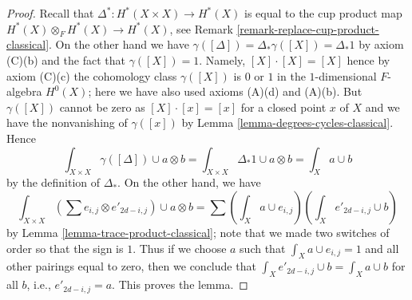 \documentclass[10pt,a4paper]{amsart}
\theoremstyle{plain}
\theoremstyle{definition}
\theoremstyle{remark}
\numberwithin{equation}{subsection}
\begin{document}
\begin{proof}
Recall that $\Delta^* : H^*(X \times X) \to H^*(X)$ is equal to the
cup product map $H^*(X) \otimes_F H^*(X) \to H^*(X)$, see
Remark \ref{remark-replace-cup-product-classical}. On the other hand we have
$\gamma([\Delta]) = \Delta_*\gamma([X]) = \Delta_*1$ by
axiom (C)(b) and the fact that $\gamma([X]) = 1$. Namely,
$[X] \cdot [X] = [X]$ hence by axiom (C)(c) the cohomology class
$\gamma([X])$ is $0$ or $1$ in the $1$-dimensional $F$-algebra $H^0(X)$;
here we have also used axioms (A)(d) and (A)(b).
But $\gamma([X])$ cannot be zero as $[X] \cdot [x] = [x]$
for a closed point $x$ of $X$ and we have the nonvanishing
of $\gamma([x])$ by Lemma \ref{lemma-degrees-cycles-classical}.
Hence
$$
\int_{X \times X} \gamma([\Delta]) \cup a \otimes b =
\int_{X \times X} \Delta_*1 \cup a \otimes b =
\int_X a \cup b
$$
by the definition of $\Delta_*$. On the other hand, we have
$$
\int_{X \times X} (\sum e_{i, j} \otimes e'_{2d -i , j}) \cup a \otimes b =
\sum (\int_X a \cup e_{i, j})(\int_X e'_{2d - i, j} \cup b)
$$
by Lemma \ref{lemma-trace-product-classical}; note that we made
two switches of order so that the sign is $1$.
Thus if we choose $a$ such that $\int_X a \cup e_{i, j} = 1$
and all other pairings equal to zero, then we conclude that
$\int_X e'_{2d - i, j} \cup b = \int_X a \cup b$ for all $b$, i.e.,
$e'_{2d - i, j} = a$. This proves the lemma.
\end{proof}
\end{document}
